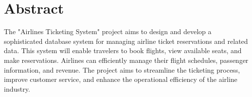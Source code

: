 \section*{Abstract}

The "Airlines Ticketing System" project aims to design and develop a sophisticated database system for managing airline ticket reservations and related data. This system will enable travelers to book flights, view available seats, and make reservations. Airlines can efficiently manage their flight schedules, passenger information, and revenue. The project aims to streamline the ticketing process, improve customer service, and enhance the operational efficiency of the airline industry.


\clearpage